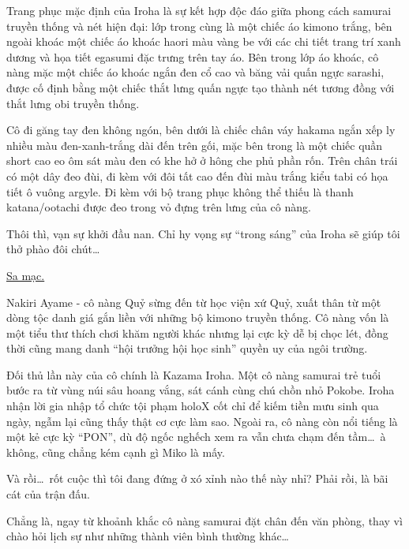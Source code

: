 \documentclass[../main.tex]{subfiles}
\begin{document}
Trang phục mặc định của Iroha là sự kết hợp độc đáo giữa phong cách samurai truyền thống và nét hiện đại: lớp trong cùng là một chiếc áo kimono trắng, bên ngoài khoác một chiếc áo khoác haori màu vàng be với các chi tiết trang trí xanh dương và họa tiết egasumi đặc trưng trên tay áo. Bên trong lớp áo khoác, cô nàng mặc một chiếc áo khoác ngắn đen cổ cao và băng vải quấn ngực sarashi, được cố định bằng một chiếc thắt lưng quấn ngực tạo thành nét tương đồng với thắt lưng obi truyền thống.

Cô đi găng tay đen không ngón, bên dưới là chiếc chân váy hakama ngắn xếp ly nhiều màu đen-xanh-trắng dài đến trên gối, mặc bên trong là một chiếc quần short cao eo ôm sát màu đen có khe hở ở hông che phủ phần rốn. Trên chân trái có một dây đeo đùi, đi kèm với đôi tất cao đến đùi màu trắng kiểu tabi có họa tiết ô vuông argyle. Đi kèm với bộ trang phục không thể thiếu là thanh katana/ootachi được đeo trong vỏ đựng trên lưng của cô nàng.

\chrint

Thôi thì, vạn sự khởi đầu nan. Chỉ hy vọng sự ``trong sáng'' của Iroha sẽ giúp tôi thở phào đôi chút\dots

\il

\begin{center}
    \uline{Sa mạc.}
\end{center}

Nakiri Ayame - cô nàng Quỷ sừng đến từ học viện xứ Quỷ, xuất thân từ một dòng tộc danh giá gắn liền với những bộ kimono truyền thống. Cô nàng vốn là một tiểu thư thích chơi khăm người khác nhưng lại cực kỳ dễ bị chọc lét, đồng thời cũng mang danh ``hội trưởng hội học sinh'' quyền uy của ngôi trường.

Đối thủ lần này của cô chính là Kazama Iroha. Một cô nàng samurai trẻ tuổi bước ra từ vùng núi sâu hoang vắng, sát cánh cùng chú chồn nhỏ Pokobe. Iroha nhận lời gia nhập tổ chức tội phạm holoX cốt chỉ để kiếm tiền mưu sinh qua ngày, ngẫm lại cũng thấy thật cơ cực làm sao. Ngoài ra, cô nàng còn nổi tiếng là một kẻ cực kỳ ``PON'', dù độ ngốc nghếch xem ra vẫn chưa chạm đến tầm\dots\ à không, cũng chẳng kém cạnh gì Miko là mấy.


Và rồi\dots\ rốt cuộc thì tôi đang đứng ở xó xỉnh nào thế này nhỉ? Phải rồi, là bãi cát của trận đấu.

Chẳng là, ngay từ khoảnh khắc cô nàng samurai đặt chân đến văn phòng, thay vì chào hỏi lịch sự như những thành viên bình thường khác\dots
\end{document}
